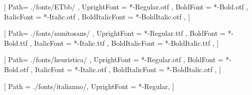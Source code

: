 \usepackage{lipsum}
\usepackage{blindtext}

\usepackage{microtype}
\usepackage[]{fontspec}

\setmainfont{etbb}[%
	Path= ./fonts/ETbb/ ,
	UprightFont		= *-Regular.otf ,
	BoldFont		= *-Bold.otf ,
	ItalicFont      = *-Italic.otf ,
	BoldItalicFont  = *-BoldItalic.otf ,
]

\setsansfont{NunitoSans}[%
	Path= ./fonts/nunitosans/ ,
	UprightFont		= *-Regular.ttf ,
	BoldFont		= *-Bold.ttf ,
	ItalicFont      = *-Italic.ttf ,
	BoldItalicFont  = *-BoldItalic.ttf ,
]

\setmonofont{Heuristica}[%
	Path= ./fonts/heuristica/ ,
	UprightFont		= *-Regular.otf ,
	BoldFont		= *-Bold.otf ,
	ItalicFont      = *-Italic.otf ,
	BoldItalicFont  = *-BoldItalic.otf ,
]

\newfontfamily{}[%
	Path            =   ./fonts/italianno/,
	UprightFont     =   *-Regular,
] 

%
%

\setlxvchars[\normalfont\normalsize]

\setstocksize{11in}{8in} %
\settrimmedsize{\stockheight}{\stockwidth}{*}

\settypeblocksize{50\onelineskip}{\lxvchars}{*}
\setmarginnotes{17pt}{51pt}{\onelineskip}
\checkandfixthelayout[lines]





\pagestyle{mypagestyle}		

